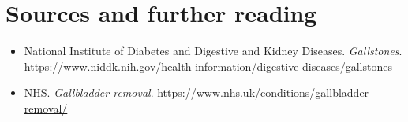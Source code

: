 \section*{Sources and further reading}
\begin{itemize}
    \item National Institute of Diabetes and Digestive and Kidney Diseases. \textit{Gallstones}. \url{https://www.niddk.nih.gov/health-information/digestive-diseases/gallstones}
    \item NHS. \textit{Gallbladder removal}. \url{https://www.nhs.uk/conditions/gallbladder-removal/}
\end{itemize}
